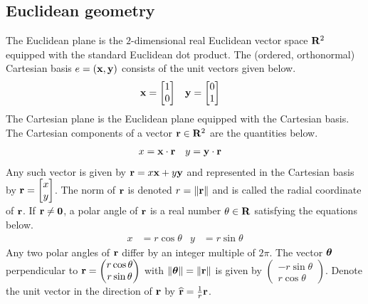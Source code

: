 \subsection{Euclidean geometry}
The Euclidean plane is the $2$-dimensional real Euclidean vector space $\mathbf{R}^2$ equipped with the standard Euclidean dot product.
The (ordered, orthonormal) Cartesian basis $e = \left(\mathbf{x}, \mathbf{y}\right)$ consists of the unit vectors given below.
\begin{align*}
	\mathbf{x} & =
	\begin{bmatrix}
		1 \\ 0
	\end{bmatrix}
	    &
	\mathbf{y} & =
	\begin{bmatrix}
		0 \\ 1
	\end{bmatrix}
\end{align*}
The Cartesian plane is the Euclidean plane equipped with the Cartesian basis.
The Cartesian components of a vector $\mathbf{r} \in \mathbf{R}^2$ are the quantities below.
\begin{align*}
	x & = \mathbf{x} \cdot \mathbf{r}
	  &
	y & = \mathbf{y} \cdot \mathbf{r}
\end{align*}
Any such vector is given by $\mathbf{r} = x \mathbf{x} + y \mathbf{y}$ and represented in the Cartesian basis by $\mathbf{r} = \begin{bmatrix} x \\ y \end{bmatrix}$.
The norm of $\mathbf{r}$ is denoted $r = \left\|\mathbf{r}\right\|$ and is called the radial coordinate of $\mathbf{r}$.
If $\mathbf{r} \neq \mathbf{0}$, a polar angle of $\mathbf{r}$ is a real number $\theta \in \mathbf{R}$ satisfying the equations below.
\begin{align*}
	x & = r \cos \theta
	  &
	y & = r \sin \theta
\end{align*}
Any two polar angles of $\mathbf{r}$ differ by an integer multiple of $2 \pi$.
The vector $\bm{\theta}$ perpendicular to $\mathbf{r} = \begin{pmatrix} r \cos \theta \\ r \sin \theta \end{pmatrix}$ with $\left\|\bm{\theta}\right\| = \left\|\mathbf{r}\right\|$ is given by $\begin{pmatrix} - r \sin \theta \\ r \cos \theta \end{pmatrix}$.
Denote the unit vector in the direction of $\mathbf{r}$ by $\widehat{\mathbf{r}} = \frac{1}{r} \mathbf{r}$.

